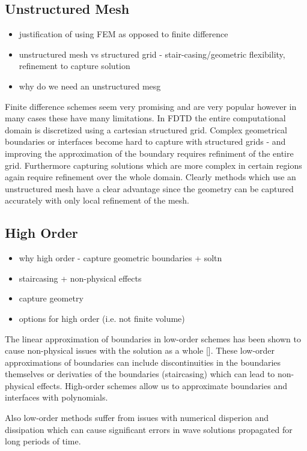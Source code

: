 \subsection{Unstructured Mesh}
\begin{itemize}
	\item justification of using FEM as opposed to finite difference
	\item unstructured mesh vs structured grid - stair-casing/geometric flexibility, refinement to capture solution
	\item why do we need an unstructured mesg
\end{itemize}
Finite difference schemes seem very promising and are very popular however in many cases these have many limitations. In FDTD the entire computational domain is discretized using a cartesian structured grid. Complex geometrical boundaries or interfaces become hard to capture with structured grids - and improving the approximation of the boundary requires refiniment of the entire grid. Furthermore capturing solutions which are more complex in certain regions again require refinement over the whole domain. Clearly methods which use an unstructured mesh have a clear advantage since the geometry can be captured accurately with only local refinement of the mesh.

\subsection{High Order}
\begin{itemize}
	\item why high order - capture geometric boundaries + soltn
	\item staircasing + non-physical effects
	\item capture geometry
	\item options for high order (i.e. not finite volume)
\end{itemize}
The linear approximation of boundaries in low-order schemes has been shown to cause non-physical issues with the solution as a whole []. These low-order approximations of boundaries can include discontinuities in the boundaries themselves or derivaties of the boundaries (staircasing) which can lead to non-physical effects. High-order schemes allow us to approximate boundaries and interfaces with polynomials.

Also low-order methods suffer from issues with numerical disperion and dissipation which can cause significant errors in wave solutions propagated for long periods of time.


